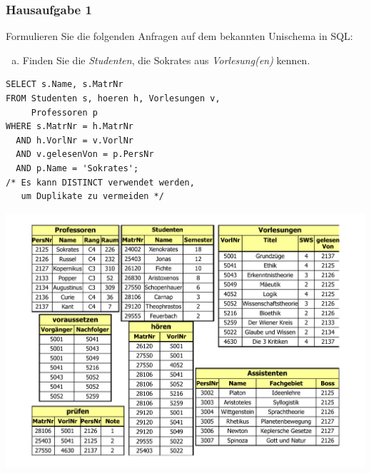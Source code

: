 \begin{frame}[fragile]
	\frametitle{Hausaufgabe 1}
	\vspace{0.5cm}

	\begin{multicols}{2}
		Formulieren Sie die folgenden Anfragen auf dem bekannten Unischema in SQL:
		\begin{enumerate}[a)]
			\item Finden Sie die \textit{Studenten}, die Sokrates aus \textit{Vorlesung(en)} kennen.
		\end{enumerate}

		\begin{verbatim}
SELECT s.Name, s.MatrNr
FROM Studenten s, hoeren h, Vorlesungen v, 
     Professoren p
WHERE s.MatrNr = h.MatrNr
  AND h.VorlNr = v.VorlNr
  AND v.gelesenVon = p.PersNr
  AND p.Name = 'Sokrates';
/* Es kann DISTINCT verwendet werden, 
   um Duplikate zu vermeiden */
		\end{verbatim}
		\vfill\columnbreak

		\begin{center}
			\includegraphics[height=.6\paperheight]{../img/uni.pdf}
		\end{center}
	\end{multicols}
\end{frame}

